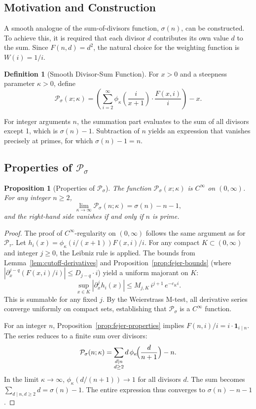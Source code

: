 \documentclass[11pt,a4paper]{amsart}
\theoremstyle{plain}
\newtheorem{proposition}[theorem]{Proposition}
\theoremstyle{definition}
\newtheorem{definition}[theorem]{Definition}
\theoremstyle{remark}
\begin{document}
\subsection{Motivation and Construction}
A smooth analogue of the sum-of-divisors function, $\sigma(n)$, can be constructed.
To achieve this, it is required that each divisor $d$ contributes its own value $d$ to the sum.
Since $F(n,d)=d^2$, the natural choice for the weighting function is $W(i)=1/i$.
\begin{definition}[Smooth Divisor-Sum Function]
For $x>0$ and a steepness parameter $\kappa>0$, define
\begin{equation}\label{eq:Psigma}
\mathcal{P}_{\sigma}(x; \kappa) = \left( \sum_{i=2}^{\infty} \phi_{\kappa}\!\left(\frac{i}{x+1}\right) \cdot \frac{F(x,i)}{i} \right) - x.
\end{equation}
\end{definition}
For integer arguments $n$, the summation part evaluates to the sum of all divisors except 1, which is $\sigma(n)-1$. Subtraction of $n$ yields an expression that vanishes precisely at primes, for which $\sigma(n)-1=n$.
\subsection{Properties of $\mathcal{P}_{\sigma}$}

\begin{proposition}[Properties of $\mathcal{P}_{\sigma}$]
The function $\mathcal{P}_{\sigma}(x;\kappa)$ is $C^\infty$ on $(0,\infty)$. For any integer $n\ge2$,
\[
\lim_{\kappa\to\infty} \mathcal{P}_{\sigma}(n; \kappa) = \sigma(n) - n - 1,
\]
and the right-hand side vanishes if and only if $n$ is prime.
\end{proposition}

\begin{proof}
The proof of $C^\infty$-regularity on $(0,\infty)$ follows the same argument as for $\mathcal{P}_{\tau}$. Let $h_i(x) = \phi_{\kappa}(i/(x+1)) F(x,i)/i$. For any compact $K\subset(0,\infty)$ and integer $j\ge0$, the Leibniz rule is applied. The bounds from Lemma~\ref{lem:cutoff-derivatives} and Proposition~\ref{prop:fejer-bounds} (where $|\partial_x^{j-q} (F(x,i)/i)| \le D_{j-q} \cdot i$) yield a uniform majorant on $K$:
\[
\sup_{x\in K} |\partial_x^j h_i(x)| \le M_{j,K} \, i^{j+1} \, e^{-c_K i}.
\]
This is summable for any fixed $j$. By the Weierstrass M-test, all derivative series converge uniformly on compact sets, establishing that $\mathcal{P}_{\sigma}$ is a $C^\infty$ function.

For an integer $n$, Proposition~\ref{prop:fejer-properties} implies $F(n,i)/i = i \cdot \mathbf{1}_{i\mid n}$. The series reduces to a finite sum over divisors:
\[
\mathcal{P}_{\sigma}(n;\kappa)=\sum_{\substack{d\mid n\\ d\ge2}} d\,\phi_{\kappa}\!\Bigl(\frac{d}{n+1}\Bigr)-n.
\]
In the limit $\kappa\to\infty$, $\phi_{\kappa}(d/(n+1))\to 1$ for all divisors $d$. The sum becomes $\sum_{d\mid n, d\ge2} d = \sigma(n)-1$. The entire expression thus converges to $\sigma(n)-n-1$.
\end{proof}
\end{document}
